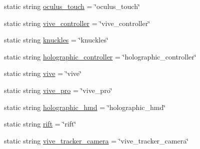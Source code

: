 \begin{DoxyCompactItemize}
\item 
static string \mbox{\hyperlink{class_valve_1_1_v_r_1_1_steam_v_r___input___manifest_file___application___binding___controller_types_a4b477a5f664c1311f4fa67168de4f6ac}{oculus\+\_\+touch}} = \char`\"{}oculus\+\_\+touch\char`\"{}
\item 
static string \mbox{\hyperlink{class_valve_1_1_v_r_1_1_steam_v_r___input___manifest_file___application___binding___controller_types_abe6264094305d2d726c459a0c28903b6}{vive\+\_\+controller}} = \char`\"{}vive\+\_\+controller\char`\"{}
\item 
static string \mbox{\hyperlink{class_valve_1_1_v_r_1_1_steam_v_r___input___manifest_file___application___binding___controller_types_ac32d9095a9f65c7dfa68a6f6576b2365}{knuckles}} = \char`\"{}knuckles\char`\"{}
\item 
static string \mbox{\hyperlink{class_valve_1_1_v_r_1_1_steam_v_r___input___manifest_file___application___binding___controller_types_a29743247b0e600794a1c3a169c8717c3}{holographic\+\_\+controller}} = \char`\"{}holographic\+\_\+controller\char`\"{}
\item 
static string \mbox{\hyperlink{class_valve_1_1_v_r_1_1_steam_v_r___input___manifest_file___application___binding___controller_types_ad918f78d4f2117d4a61c40489130cb62}{vive}} = \char`\"{}vive\char`\"{}
\item 
static string \mbox{\hyperlink{class_valve_1_1_v_r_1_1_steam_v_r___input___manifest_file___application___binding___controller_types_aedf9522540c38ab6211d06cf841b3c1b}{vive\+\_\+pro}} = \char`\"{}vive\+\_\+pro\char`\"{}
\item 
static string \mbox{\hyperlink{class_valve_1_1_v_r_1_1_steam_v_r___input___manifest_file___application___binding___controller_types_aa0352f9401e3a525c386f7becd692c19}{holographic\+\_\+hmd}} = \char`\"{}holographic\+\_\+hmd\char`\"{}
\item 
static string \mbox{\hyperlink{class_valve_1_1_v_r_1_1_steam_v_r___input___manifest_file___application___binding___controller_types_aed5fb38f8fbe90eef1fc96eab4330715}{rift}} = \char`\"{}rift\char`\"{}
\item 
static string \mbox{\hyperlink{class_valve_1_1_v_r_1_1_steam_v_r___input___manifest_file___application___binding___controller_types_a6ab34febd86d6586d3375627575f8691}{vive\+\_\+tracker\+\_\+camera}} = \char`\"{}vive\+\_\+tracker\+\_\+camera\char`\"{}
\end{DoxyCompactItemize}


